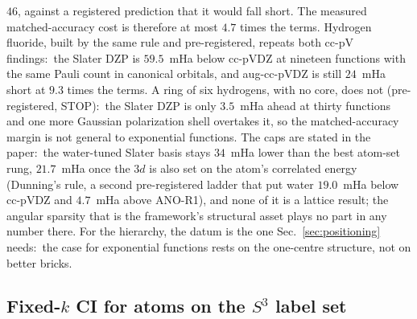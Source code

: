 \documentclass[aps,pra,twocolumn,superscriptaddress,longbibliography]{revtex4-2}
\begin{document}
$46$, against a registered prediction that it would fall short.  The
measured matched-accuracy cost is therefore at most $4.7$ times the
terms.  Hydrogen fluoride, built by the same rule and pre-registered,
repeats both cc-pV findings:\ the Slater DZP is $59.5$~mHa below cc-pVDZ at nineteen
functions with the same Pauli count in canonical orbitals, and aug-cc-pVDZ is still
$24$~mHa short at $9.3$ times the terms.  A ring of six hydrogens, with
no core, does not (pre-registered, STOP):\ the Slater DZP is only $3.5$~mHa
ahead at thirty functions and one more Gaussian polarization shell
overtakes it, so the matched-accuracy margin is not general to
exponential functions.  The
caps are stated in the paper:\ the water-tuned Slater basis
stays $34$~mHa lower than the best atom-set rung, $21.7$~mHa once the
$3d$ is also set on the atom's correlated energy (Dunning's rule, a second
pre-registered ladder that put water $19.0$~mHa below cc-pVDZ and
$4.7$~mHa above ANO-R1), and none of it is a
lattice result; the
angular sparsity that is the framework's structural asset plays no part
in any number there.  For the hierarchy, the datum is the one
Sec.~\ref{sec:positioning} needs:\ the case for exponential functions
rests on the one-centre structure, not on better bricks.

\subsection{Fixed-$k$ CI for atoms on the $S^3$ label set}
\end{document}
